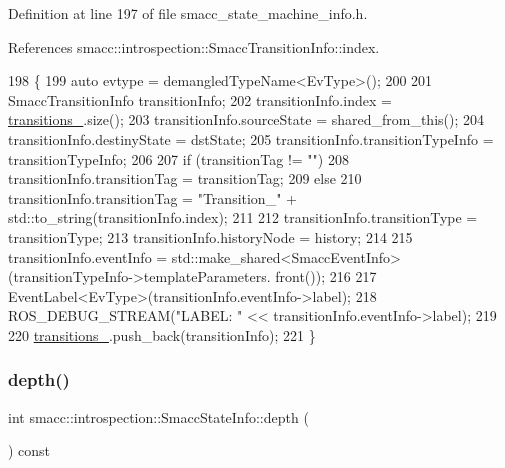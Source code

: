 Definition at line 197 of file smacc\+\_\+state\+\_\+machine\+\_\+info.\+h.



References smacc\+::introspection\+::\+Smacc\+Transition\+Info\+::index.


\begin{DoxyCode}
198 \{
199     \textcolor{keyword}{auto} evtype = demangledTypeName<EvType>();
200 
201     SmaccTransitionInfo transitionInfo;
202     transitionInfo.index = \hyperlink{classsmacc_1_1introspection_1_1SmaccStateInfo_ae8b5d8e409e377ef9a88d92fb31a8446}{transitions\_}.size();
203     transitionInfo.sourceState = shared\_from\_this();
204     transitionInfo.destinyState = dstState;
205     transitionInfo.transitionTypeInfo = transitionTypeInfo;
206 
207     \textcolor{keywordflow}{if} (transitionTag != \textcolor{stringliteral}{""})
208         transitionInfo.transitionTag = transitionTag;
209     \textcolor{keywordflow}{else}
210         transitionInfo.transitionTag = \textcolor{stringliteral}{"Transition\_"} + std::to\_string(transitionInfo.index);
211 
212     transitionInfo.transitionType = transitionType;
213     transitionInfo.historyNode = history;
214 
215     transitionInfo.eventInfo = std::make\_shared<SmaccEventInfo>(transitionTypeInfo->templateParameters.
      front());
216 
217     EventLabel<EvType>(transitionInfo.eventInfo->label);
218     ROS\_DEBUG\_STREAM(\textcolor{stringliteral}{"LABEL: "} << transitionInfo.eventInfo->label);
219 
220     \hyperlink{classsmacc_1_1introspection_1_1SmaccStateInfo_ae8b5d8e409e377ef9a88d92fb31a8446}{transitions\_}.push\_back(transitionInfo);
221 \}
\end{DoxyCode}
\mbox{\label{classsmacc_1_1introspection_1_1SmaccStateInfo_a961aa6a03d8e2f60b57ec3eab08bc6ba}} 
\subsubsection{\texorpdfstring{depth()}{depth()}}
{\footnotesize\ttfamily int smacc\+::introspection\+::\+Smacc\+State\+Info\+::depth (\begin{DoxyParamCaption}{ }\end{DoxyParamCaption}) const\hspace{0.3cm}{\ttfamily [inline]}}



